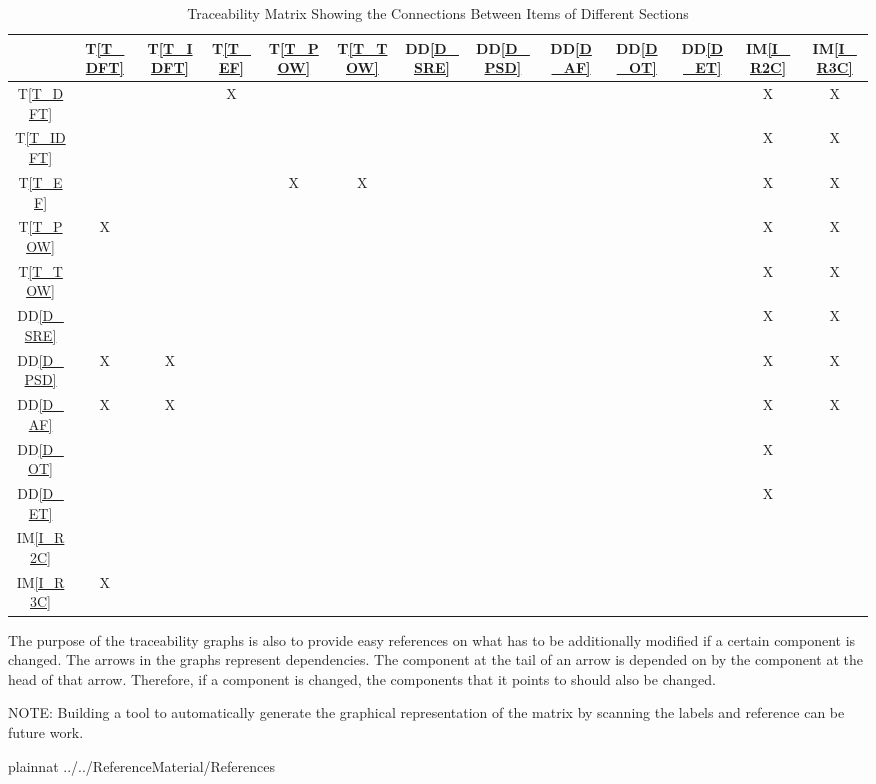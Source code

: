 \documentclass[12pt]{article}
\newcommand{\ddref}[1]{DD\ref{#1}}
\newcommand{\tref}[1]{T\ref{#1}}
\newcommand{\iref}[1]{IM\ref{#1}}
\begin{document}
\begin{table}[h!]
\centering
\begin{tabular}{|c|c|c|c|c|c|c|c|c|c|c|c|c|}
\hline        
	& \tref{T_DFT}& \tref{T_IDFT}& \tref{T_EF}& \tref{T_POW}& \tref{T_TOW}&\ddref{D_SRE}&\ddref{D_PSD} & \ddref{D_AF}&\ddref{D_OT}&\ddref{D_ET}& \iref{I_R2C}& \iref{I_R3C} \\
\hline
\tref{T_DFT}  & & &X & & & & & & & &X &X \\ \hline
\tref{T_IDFT}  & & & & & & & & & & &X & X\\ \hline
\tref{T_EF}   & & & & X&X & & & & & &X &X \\ \hline
\tref{T_POW}  & X& & & & & & & & & &X &X \\ \hline
\tref{T_TOW}  & & & & & & & & & & &X &X \\ \hline
\ddref{D_SRE}  & & & & & & & & & & &X &X \\ \hline
\ddref{D_PSD}  & X&X & & & & & & & & &X & X\\ \hline
\ddref{D_AF}   & X& X& & & & & & & & & X&X \\ \hline
\ddref{D_OT}   & & & & & & & & & & &X& \\ \hline
\ddref{D_ET}    & & & & & & & & & & &X & \\ \hline
\iref{I_R2C}     & & & & & & & & & & & &  \\ \hline
\iref{I_R3C}    & X& & & & & & & & & & & \\ \hline

\end{tabular}
\caption{Traceability Matrix Showing the Connections Between Items of Different Sections}
\label{Table:trace}
\end{table}

The purpose of the traceability graphs is also to provide easy references on
what has to be additionally modified if a certain component is changed.  The
arrows in the graphs represent dependencies. The component at the tail of an
arrow is depended on by the component at the head of that arrow. Therefore, if a
component is changed, the components that it points to should also be
changed.\par
NOTE: Building a tool to automatically generate the graphical representation of
the matrix by scanning the labels and reference can be future work.


\newpage

 {plainnat}
 {../../ReferenceMaterial/References}
\end{document}

